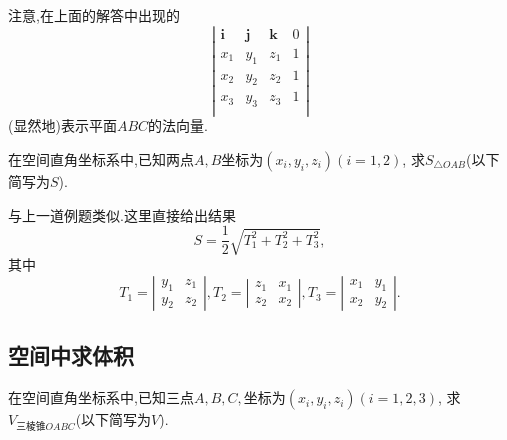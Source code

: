 注意,在上面的解答中出现的
$$
\left|
  \begin{array}{cccc}
    \bm{i}&\bm{j}&\bm{k}&0\\
    x_1&y_1&z_1&1\\
    x_2&y_2 &z_2&1\\
    x_3&y_3&z_3&1\\
  \end{array}
  \right|
$$
(显然地)表示平面$ABC$的法向量.

\prob 在空间直角坐标系中,已知两点$A,B
\textrm{坐标为}(x_i,y_i,z_i)(i=1,2)$,
求$S_{\triangle OAB}$(以下简写为$S$).

\sol 与上一道例题类似.这里直接给出结果
$$S=\frac{1}{2}\sqrt{T_1^2+T_2^2+T_3^2},$$
其中
$$
T_1=\left|\begin{array}{cc}
  y_1&z_1\\
  y_2&z_2
  \end{array}\right|
  ,
T_2=\left|\begin{array}{cc}
  z_1&x_1\\
  z_2&x_2
  \end{array}\right|
  ,
T_3=\left|\begin{array}{cc}
  x_1&y_1\\
  x_2&y_2
  \end{array}\right|
  .
$$ 
\solend

\subsection{空间中求体积}

\prob 在空间直角坐标系中,已知三点$A,B,C,
\textrm{坐标为}(x_i,y_i,z_i)(i=1,2,3)$,
求$V_{\textrm{三棱锥}OABC}$(以下简写为$V$).

